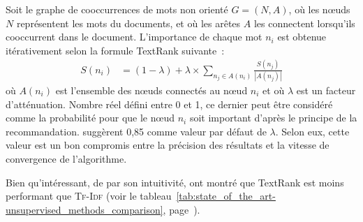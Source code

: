         Soit le graphe de cooccurrences de mots non orienté $G = (N, A)$, où les
        n\oe{}uds $N$ représentent les mots du documents, et où les arêtes $A$
        les connectent lorsqu'ils cooccurrent dans le document. L'importance de
        chaque mot $n_i$ est obtenue itérativement selon la formule TextRank
        suivante~:
        \begin{align}
          S(n_i) &= (1 - \lambda) + \lambda \times \sum_{n_j \in A(n_i)} \frac{S(n_j)}{|A(n_j)|} \label{math:textrank}
        \end{align}
        où $A(n_i)$ est l'ensemble des n\oe{}uds connectés au n\oe{}ud $n_i$ et
        où $\lambda$ est un facteur d'atténuation. Nombre réel défini entre 0 et
        1, ce dernier peut être considéré comme la probabilité pour que le
        n\oe{}ud $n_i$ soit important d'après le principe de la recommandation.
         suggèrent 0,85 comme valeur par défaut de
        $\lambda$. Selon eux, cette valeur est un bon compromis entre la
        précision des résultats et la vitesse de convergence de l'algorithme.

        Bien qu'intéressant, de par son intuitivité,
         ont montré que TextRank est moins
        performant que \textsc{Tf-Idf} (voir le
        tableau~\ref{tab:state_of_the_art-unsupervised_methods_comparison},
        page~\pageref{tab:state_of_the_art-unsupervised_methods_comparison}).

